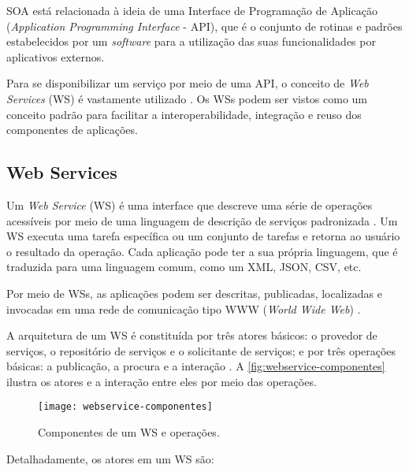 	SOA está relacionada à ideia de uma Interface de Programação de Aplicação (\textit{Application Programming Interface} - API), que é o conjunto de rotinas e padrões estabelecidos por um \textit{software} para a utilização das suas funcionalidades por aplicativos externos.
	
	Para se disponibilizar um serviço por meio de uma API, o conceito de \textit{Web Services} (WS) é vastamente utilizado \cite{souit2013soa}. Os WSs podem ser vistos como um conceito padrão para facilitar a interoperabilidade, integração e reuso dos componentes de aplicações.
	
	\subsection{Web Services}

	Um \textit{Web Service} (WS) é uma interface que descreve uma série de operações acessíveis por meio de uma linguagem de descrição de serviços padronizada \cite{gottschalk2002webservices}. Um WS executa uma tarefa específica ou um conjunto de tarefas e retorna ao usuário o resultado da operação. Cada aplicação pode ter a sua própria linguagem, que é traduzida para uma linguagem comum, como um XML, JSON, CSV, etc.
	
	Por meio de WSs, as aplicações podem ser descritas, publicadas, localizadas e invocadas em uma rede de comunicação tipo WWW (\textit{World Wide Web}) \cite{souit2013soa}.
	
	A arquitetura de um WS é constituída por três atores básicos: o provedor de serviços, o repositório de serviços e o solicitante de serviços; e por três operações básicas: a publicação, a procura e a interação \cite{gottschalk2002webservices}. A \autoref{fig:webservice-componentes} ilustra os atores e a interação entre eles por meio das operações.
	
	\begin{figure}[htb]
		\centering
		\label{fig:webservice-componentes}
		\texttt{[image: webservice-componentes]}
		\caption{Componentes de um WS e operações.}
	\end{figure}

	Detalhadamente, os atores em um WS são:
	

